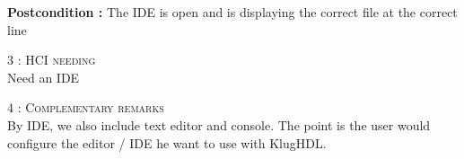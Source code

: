 \begin{flushleft}
    \textbf{\large Postcondition :} The IDE is open and is displaying the correct file at the correct line

    \BlackLine
    \textsc{\Large 3 : HCI needing}\\[0.3cm]

    Need an IDE

    \BlackLine
    \textsc{\Large 4 : Complementary remarks}\\[0.3cm]

    By IDE, we also include text editor and console. The point is the user would configure the editor / IDE he want to use with KlugHDL.

\end{flushleft}
